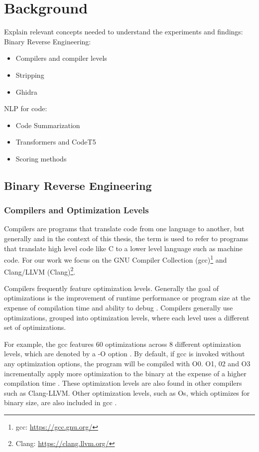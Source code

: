 \chapter{Background}
\label{background}
Explain relevant concepts needed to understand the experiments and findings:\\

Binary Reverse Engineering:
\begin{itemize}
    \item Compilers and compiler levels
    \item Stripping
    \item Ghidra
\end{itemize}

NLP for code:
\begin{itemize}
\item Code Summarization
\item Transformers and CodeT5
\item Scoring methods
\end{itemize}

\newpage
\section{Binary Reverse Engineering}

\subsection{Compilers and Optimization Levels}
Compilers are programs that translate code from one language to another, but generally and in the context of this thesis, the term is used to refer to programs that translate high level code like C to a lower level language such as machine code. For our work we focus on the GNU Compiler Collection (gcc)\footnote{gcc: \url{https://gcc.gnu.org/}} and Clang/LLVM (Clang)\footnote{Clang: \url{https://clang.llvm.org/}}.

Compilers frequently feature optimization levels. Generally the goal of optimizations is the improvement of runtime performance or program size at the expense of compilation time and ability to debug \cite{ColeOptimizationLevel}. Compilers generally use optimizations, grouped into optimization levels, where each level uses a different set of optimizations.

For example, the gcc features 60 optimizations across 8 different optimization levels, which are denoted by a -O option \cite{ColeOptimizationLevel, gccOptimization}. By default, if gcc is invoked without any optimization options, the program will be compiled with O0. O1, 02 and O3 incrementally apply more optimization to the binary at the expense of a higher compilation time \cite{gccOptimization}. These optimization levels are also found in other compilers such as Clang-LLVM. Other optimization levels, such as Os, which optimizes for binary size, are also included in gcc \cite{gccOptimization}.

